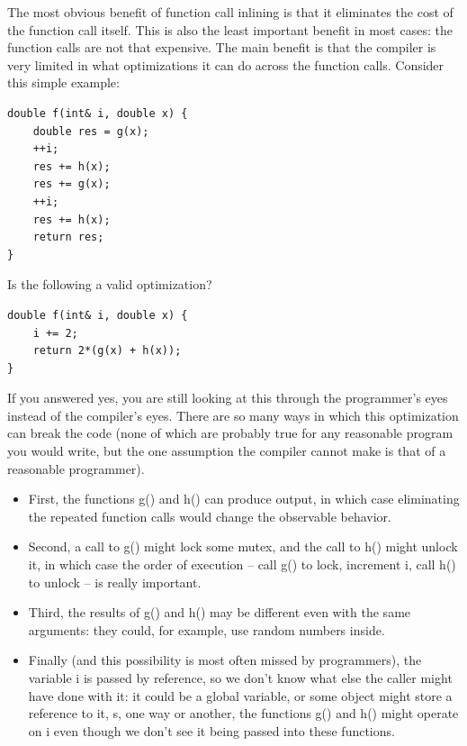 The most obvious benefit of function call inlining is that it eliminates the cost of the function call itself. This is also the least important benefit in most cases: the function calls are not that expensive. The main benefit is that the compiler is very limited in what optimizations it can do across the function calls. Consider this simple example:

\begin{lstlisting}[style=styleCXX]
double f(int& i, double x) {
	double res = g(x);
	++i;
	res += h(x);
	res += g(x);
	++i;
	res += h(x);
	return res;
}
\end{lstlisting}

Is the following a valid optimization?

\begin{lstlisting}[style=styleCXX]
double f(int& i, double x) {
	i += 2;
	return 2*(g(x) + h(x));
}
\end{lstlisting}

If you answered yes, you are still looking at this through the programmer's eyes instead of the compiler's eyes. There are so many ways in which this optimization can break the code (none of which are probably true for any reasonable program you would write, but the one assumption the compiler cannot make is that of a reasonable programmer). 

\begin{itemize}
\item
First, the functions g() and h() can produce output, in which case eliminating the repeated function calls would change the observable behavior. 

\item
Second, a call to g() might lock some mutex, and the call to h() might unlock it, in which case the order of execution – call g() to lock, increment i, call h() to unlock – is really important. 

\item
Third, the results of g() and h() may be different even with the same arguments: they could, for example, use random numbers inside. 

\item
Finally (and this possibility is most often missed by programmers), the variable i is passed by reference, so we don't know what else the caller might have done with it: it could be a global variable, or some object might store a reference to it, s, one way or another, the functions g() and h() might operate on i even though we don't see it being passed into these functions. 
	
\end{itemize}

